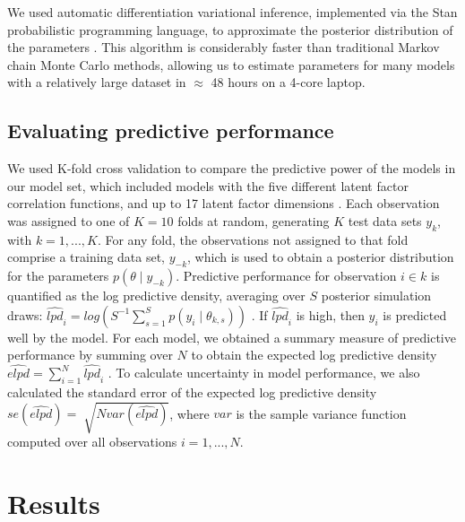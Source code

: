 We used automatic differentiation variational inference, implemented via the Stan probabilistic programming language, to approximate the posterior distribution of the parameters \citep{Hoffman2014, Kucukelbir2015} \nocite{stan-software:2015}.
This algorithm is considerably faster than traditional Markov chain Monte Carlo methods, allowing us to estimate parameters for many models with a relatively large dataset in $\approx$ 48 hours on a 4-core laptop.

\subsection{Evaluating predictive performance}

We used K-fold cross validation to compare the predictive power of the models in our model set, which included models with the five different latent factor correlation functions, and up to 17 latent factor dimensions \citep{Arlot2010}.
Each observation was assigned to one of $K=10$ folds at random, generating $K$ test data sets $y_k$, with $k = 1, ..., K$.
For any fold, the observations not assigned to that fold comprise a training data set, $y_{-k}$, which is used to obtain a posterior distribution for the parameters $p(\theta \mid y_{-k})$.
Predictive performance for observation $i \in k$ is quantified as the log predictive density, averaging over $S$ posterior simulation draws: $\widehat{lpd}_i = log(S^{-1} \sum_{s=1}^{S} p(y_i \mid \theta_{k,s}))$ \citep{gelman2014}.
If $\widehat{lpd}_i$ is high, then $y_i$ is predicted well by the model.
For each model, we obtained a summary measure of predictive performance by summing over $N$ to obtain the expected log predictive density $\widehat{elpd} = \sum_{i = 1}^N \widehat{lpd}_i$ \citep{Vehtari2015a}.
To calculate uncertainty in model performance, we also calculated the standard error of the expected log predictive density $se(\widehat{elpd}) = \sqrt[]{N var(\widehat{elpd})}$, where $var$ is the sample variance function computed over all observations $i = 1, ..., N$.

\section{Results}

